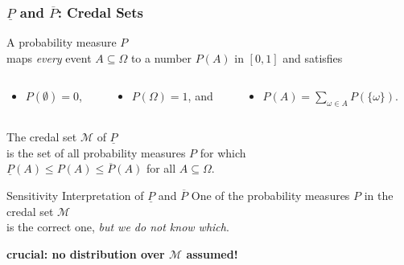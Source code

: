 \documentclass{beamer}
\newcommand{\pr}{P}
\newcommand{\lpr}{\underline{P}}
\newcommand{\upr}{\overline{P}}
\begin{document}
\begin{frame}
  \frametitle{$\lpr$ and $\upr$: Credal Sets}
  \begin{definition}
    A \alert{probability measure} $\pr$
    \\
    maps
    \textit{every}
    event $A\subseteq\Omega$ to a number $\pr(A)$
    in $[0,1]$
    and satisfies
\begin{columns}
\begin{column}{0.2\textwidth}
    \begin{itemize}
    \item $\pr(\emptyset)=0$,
    \end{itemize}
\end{column}
\begin{column}{0.3\textwidth}
    \begin{itemize}
    \item $\pr(\Omega)=1$, and
    \end{itemize}
\end{column}
\begin{column}{0.45\textwidth}
    \begin{itemize}
    \item $\pr(A)=\sum_{\omega\in A}\pr(\{\omega\})$.
    \end{itemize}
\end{column}
\end{columns}
  \end{definition}
\pause
  \begin{definition}
    The \alert{credal set} $\mathcal{M}$
    of $\lpr$
    \\ is the set of all probability measures $\pr$ for which
    \\ 
    $\lpr(A)\le\pr(A)\le\upr(A)$ for all $A\subseteq\Omega$.
  \end{definition}
\pause
  \begin{block}{Sensitivity Interpretation of $\lpr$ and $\upr$}
    One of the probability measures $\pr$ in the credal set $\mathcal{M}$\\
    is the correct one,
    \textit{but we do not know which}.
  \end{block}
\pause
    \textbf{crucial: no distribution over $\mathcal{M}$ assumed!} %
\end{frame}
\end{document}
